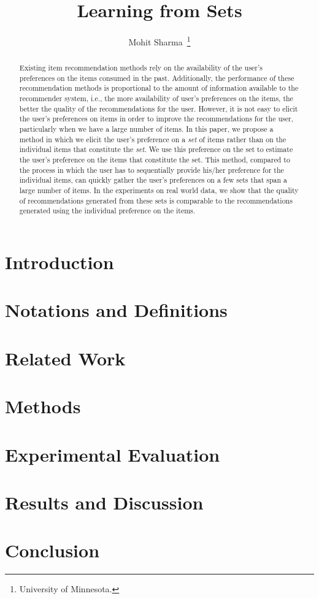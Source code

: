 \documentclass{sig-alternate-05-2015}
\begin{document}
\title{\Large Learning from Sets}
\author{Mohit Sharma~\thanks{University of Minnesota.}}
\date{}
\maketitle

\begin{abstract} \small
Existing item recommendation methods rely on the availability of the user's preferences 
on the items consumed in the past. Additionally, the performance of these recommendation methods
is proportional to the amount of information available to the recommender
system, i.e., the more availability of user's preferences on the items, the  better
the quality of the recommendations for the user.
However, it is not easy to elicit the user's preferences
on items in order to improve the recommendations for the user, particularly when
we have a large number of items. 
In this paper, we propose a method in which we elicit the user's preference on a
\textit{set} of items rather than on the individual items that constitute the
\textit{set}. We use this preference on the set to estimate the user's preference on the items
that constitute the set. This method, compared to the process in which the user
has to sequentially provide his/her preference for the individual items, can
quickly gather the user's preferences on a few sets that span a large number of
items. In the experiments on real world data, we show that the quality of
recommendations generated from these sets is comparable to the recommendations
generated using the individual preference on the items.


\end{abstract}

\section{Introduction}


\section{Notations and Definitions}


\section{Related Work}


\section{Methods}


\section{Experimental Evaluation}
%

\section{Results and Discussion}
%

\section{Conclusion}
%

{}

\end{document}
